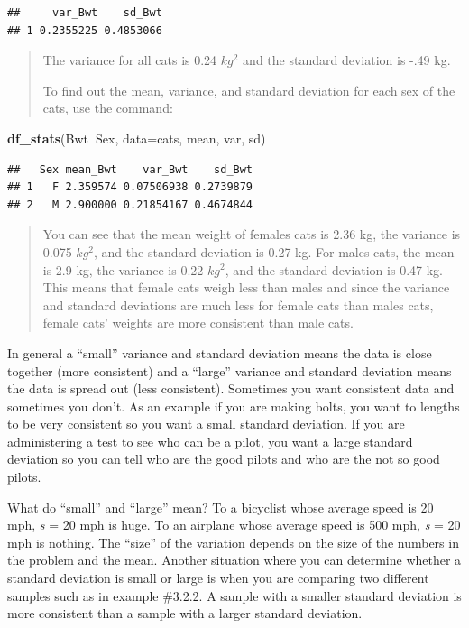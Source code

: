\documentclass[]{book}
\newenvironment{Shaded}{\begin{snugshade}}{\end{snugshade}}
\newcommand{\DataTypeTok}[1]{\textcolor[rgb]{0.13,0.29,0.53}{#1}}
\newcommand{\KeywordTok}[1]{\textcolor[rgb]{0.13,0.29,0.53}{\textbf{#1}}}
\newcommand{\NormalTok}[1]{#1}
\newcommand{\OperatorTok}[1]{\textcolor[rgb]{0.81,0.36,0.00}{\textbf{#1}}}
\begin{document}
\begin{verbatim}
##     var_Bwt    sd_Bwt
## 1 0.2355225 0.4853066
\end{verbatim}

\begin{quote}
The variance for all cats is 0.24 \(kg^2\) and the standard deviation is -.49 kg.

To find out the mean, variance, and standard deviation for each sex of the cats, use the command:
\end{quote}

\begin{Shaded}
\begin{Highlighting}[]
\KeywordTok{df_stats}\NormalTok{(Bwt}\OperatorTok{~}\NormalTok{Sex, }\DataTypeTok{data=}\NormalTok{cats, mean, var, sd)}
\end{Highlighting}
\end{Shaded}

\begin{verbatim}
##   Sex mean_Bwt    var_Bwt    sd_Bwt
## 1   F 2.359574 0.07506938 0.2739879
## 2   M 2.900000 0.21854167 0.4674844
\end{verbatim}

\begin{quote}
You can see that the mean weight of females cats is 2.36 kg, the variance is 0.075 \(kg^2\), and the standard deviation is 0.27 kg. For males cats, the mean is 2.9 kg, the variance is 0.22 \(kg^2\), and the standard deviation is 0.47 kg. This means that female cats weigh less than males and since the variance and standard deviations are much less for female cats than males cats, female cats' weights are more consistent than male cats.
\end{quote}

In general a ``small'' variance and standard deviation means the data is close together
(more consistent) and a ``large'' variance and standard deviation means the data is
spread out (less consistent). Sometimes you want consistent data and
sometimes you don't. As an example if you are making bolts, you want to
lengths to be very consistent so you want a small standard deviation. If
you are administering a test to see who can be a pilot, you want a large
standard deviation so you can tell who are the good pilots and who are
the not so good pilots.

What do ``small'' and ``large'' mean? To a bicyclist whose average speed is
20 mph, \emph{s} = 20 mph is huge. To an airplane whose average speed is 500
mph, \emph{s} = 20 mph is nothing. The ``size'' of the variation depends on the
size of the numbers in the problem and the mean. Another situation where
you can determine whether a standard deviation is small or large is when
you are comparing two different samples such as in example \#3.2.2. A
sample with a smaller standard deviation is more consistent than a
sample with a larger standard deviation.
\end{document}
